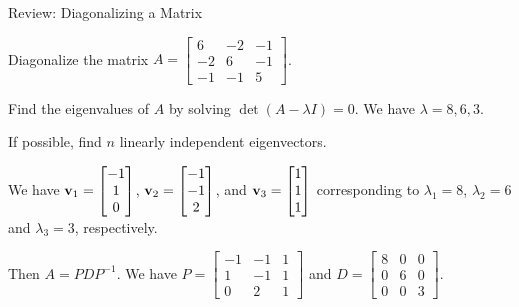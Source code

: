 \documentclass[xcolor=dvipsnames,aspectratio=169,t]{beamer}
\begin{document}
\begin{frame}{Review: Diagonalizing a Matrix}
\smallskip

Diagonalize the matrix $A = \begin{bmatrix} 6 & -2 & -1 \\ -2 & 6 & -1 \\ -1 & -1 & 5 \end{bmatrix}$.
\medskip

\bb
\ii Find the eigenvalues of $A$ by solving $\det(A - \lambda I) = 0$. \alert{We have $\lambda = 8, 6, 3$.}
\medskip

\pause
\ii If possible, find $n$ linearly independent eigenvectors. 
\medskip

\alert{We have $\mathbf{v}_1 = \begin{bmatrix} -1 \\ 1 \\ 0 \end{bmatrix}$, $\mathbf{v}_2 = \begin{bmatrix} -1 \\ -1 \\ 2 \end{bmatrix}$, and $\mathbf{v}_3 = \begin{bmatrix} 1 \\ 1 \\ 1 \end{bmatrix}$ corresponding to $\lambda_1 = 8$, $\lambda_2 = 6$ and $\lambda_3 = 3$, respectively.}

\pause
\ii Then $A=PDP^{-1}$. \alert{We have  $P = \begin{bmatrix} -1 & -1 & 1 \\ 1 & -1 & 1 \\ 0 & 2 & 1 \end{bmatrix}$ and $D = \begin{bmatrix} 8 & 0 & 0 \\ 0 & 6 & 0 \\ 0 & 0 & 3 \end{bmatrix}$.}
\ee

\end{frame}
\end{document}
